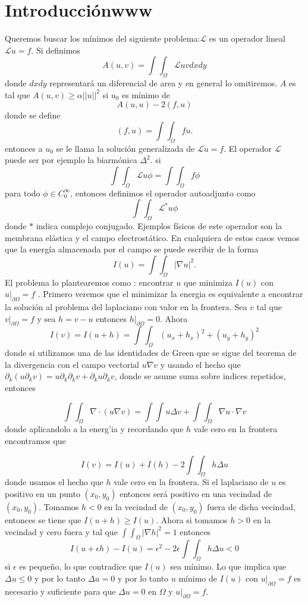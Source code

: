 \documentclass[a4paper,10pt]{book}
\begin{document}
\section{Introducci\'onwww}
Queremos buscar los m\'inimos del siguiente problema:$\mathscr{L}$ es un operador lineal
$\mathscr{L} u=f$.   Si definimos
\[A(u,v)=\int\int_{\Omega} \mathscr{L} u v  dx dy \] 
donde $dx dy$ representar\'a un diferencial de area y en general lo omitiremos.
$A$ es tal que $A(u,v)\geq \alpha {|| u ||}^2$ si  $u_0$ es m\'inimo de 
\[A(u,u)-2 (f,u) \]
donde se define
\[(f,u)=\int\int_{\Omega} f u .\]
entonces a $u_0$ se le llama la soluci\'on generalizada de $\mathscr{L} u=f$. El operador $\mathscr{L}$ puede ser 
por ejemplo la  biarm\'onica $\Delta^2$.
si
\[\int\int_{\Omega} \mathscr{L} u\phi =\int \int_{\Omega} f \phi  \]
para todo $\phi \in C_0^\infty$, entonces definimos el operador autoadjunto como 
\[\int\int_{\Omega} \mathscr{L}^{*} u\phi \]
donde $*$ indica complejo conjugado. Ejemplos f\'isicos de este operador son 
la membrana el\'astica y el campo electrost\'atico. En cualquiera de estos casos
vemos que la energ\'ia almacenada por el campo se puede escribir de la forma
\[I(u)=\int\int_{\Omega} |\nabla u |^2  .\]
El problema lo plantearemos como : encontrar $u$  que minimiza $I(u)$ con $u|_{\partial \Omega}=f$ .
Primero veremos que el minimizar la energia es equivalente a encontrar la soluci\'on al problema 
del laplaciano con valor en la frontera. Sea $v$ tal que $v|_{\partial \Omega}=f$ y sea
$h=v-u$ entonces $h|_{\partial \Omega}=0$. Ahora
\[I(v)= I(u+h)=  \int \int_{\Omega} (u_x +h_x)^2+(u_y+h_y)^2  \]
donde si utilizamos una de las identidades de Green que se sigue del teorema de la divergencia con 
el campo vectorial $u \nabla v $ y usando el hecho que $\partial_{k}(u\partial_k v)=u \partial _k \partial _k v+  \partial _k u \partial _k v$,
donde se asume  suma sobre indices repetidos, entonces

\[\int\int_{\Omega} \nabla \cdot (u \nabla v)   =\int\int u \Delta v + \int\int_\Omega \nabla u\cdot\nabla v \]
donde  aplicandolo a la energ'ia y recordando que $h$ vale cero en la frontera encontramos que

\[I(v)=I(u)+I(h)-2\int\int_{\Omega} h \Delta u  \] 
donde usamos el hecho que $h$ vale cero en la frontera. Si el laplaciano de $u$ es positivo en un punto $(x_0,y_0)$
entonces ser\'a positivo en una vecindad de $(x_0,y_0)$.  Tomamos $h<0$ en la vecindad de $(x_0,y_0)$
fuera de dicha vecindad, entonces se tiene que $I(u+h)\geq I(u)$. Ahora si tomamos
$h>0$ en la vecindad y cero fuera y tal que $\int\int_{\Omega} |\nabla h|^2 =1$   entonces
\[I(u+\epsilon h)-I(u)= \epsilon^2-2\epsilon \int\int_{\Omega} h \Delta u <0\]
si $ \epsilon$ es peque\~no, lo que contradice que $I(u)$ sea m\'inimo. Lo que implica que
$\Delta u\leq 0$ y por lo tanto $\Delta u=0$ y por lo tanto $u$ m\'inimo de $I(u)$  con $u|_{\partial \Omega} =f$ es necesario
y suficiente para que $\Delta u=0$ en $\Omega$ y $u|_{\partial \Omega}=f$.
\end{document}
